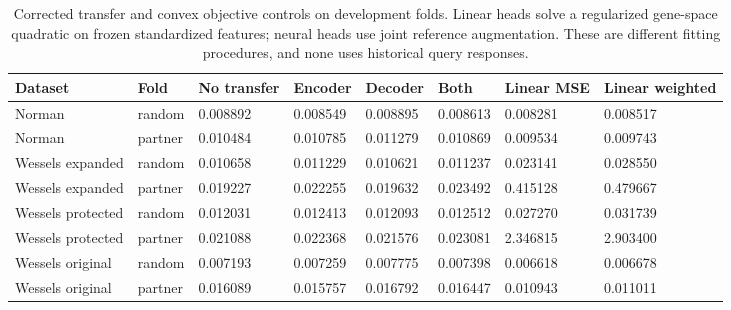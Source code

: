 \begin{table}[htbp]\centering\normalsize\begin{tabular}{llllllll}
\toprule
Dataset & Fold & No transfer & Encoder & Decoder & Both & Linear MSE & Linear weighted \\
\midrule
Norman & random & 0.008892 & 0.008549 & 0.008895 & 0.008613 & 0.008281 & 0.008517 \\
Norman & partner & 0.010484 & 0.010785 & 0.011279 & 0.010869 & 0.009534 & 0.009743 \\
Wessels expanded & random & 0.010658 & 0.011229 & 0.010621 & 0.011237 & 0.023141 & 0.028550 \\
Wessels expanded & partner & 0.019227 & 0.022255 & 0.019632 & 0.023492 & 0.415128 & 0.479667 \\
Wessels protected & random & 0.012031 & 0.012413 & 0.012093 & 0.012512 & 0.027270 & 0.031739 \\
Wessels protected & partner & 0.021088 & 0.022368 & 0.021576 & 0.023081 & 2.346815 & 2.903400 \\
Wessels original & random & 0.007193 & 0.007259 & 0.007775 & 0.007398 & 0.006618 & 0.006678 \\
Wessels original & partner & 0.016089 & 0.015757 & 0.016792 & 0.016447 & 0.010943 & 0.011011 \\
\bottomrule
\end{tabular}
\caption{Corrected transfer and convex objective controls on development folds. Linear heads solve a regularized gene-space quadratic on frozen standardized features; neural heads use joint reference augmentation. These are different fitting procedures, and none uses historical query responses.}\end{table}
